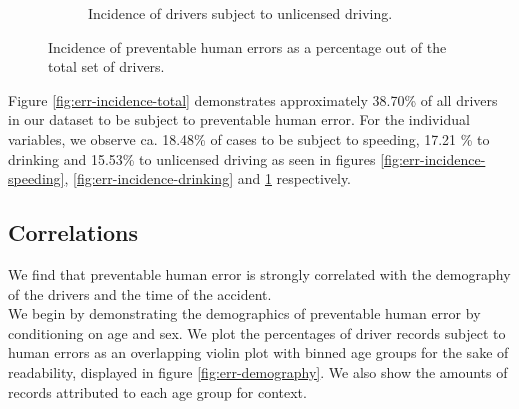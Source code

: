 \documentclass{article}
\theoremstyle{plain}
\theoremstyle{definition}
\theoremstyle{remark}
\begin{document}
\begin{figure}[ht]
\begin{subfigure}[ht]{0.49\columnwidth}
			\caption{Incidence of drivers subject to unlicensed driving.}
			\label{fig:err-incidence-license}
		\end{subfigure}
	\caption{Incidence of preventable human errors as a percentage out of the total set of drivers.}
	\label{fig:incidence}
	\vskip 0.2in
\end{figure}
Figure \ref{fig:err-incidence-total} demonstrates approximately 38.70\% of all drivers in our dataset to be subject to preventable human error. For the individual variables, we observe ca. 18.48\% of cases to be subject to speeding, 17.21 \% to drinking and 15.53\% to unlicensed driving as seen in figures \ref{fig:err-incidence-speeding}, \ref{fig:err-incidence-drinking} and \ref{fig:err-incidence-license} respectively.

\subsection{Correlations}
We find that preventable human error is strongly correlated with the demography of the drivers and the time of the accident.
\\
We begin by demonstrating the demographics of preventable human error by conditioning on age and sex. We plot the percentages of driver records subject to human errors as an overlapping violin plot with binned age groups for the sake of readability, displayed in figure \ref{fig:err-demography}. We also show the amounts of records attributed to each age group for context.
\end{document}
